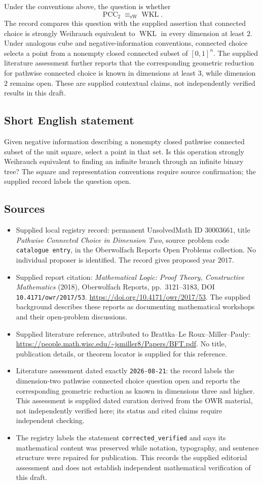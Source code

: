\documentclass[11pt]{article}
\begin{document}
Under the conventions above, the question is whether
\[
\operatorname{PCC}_2\equiv_{\mathrm{sW}}\operatorname{WKL}.
\]
The record compares this question with the supplied assertion that connected choice is strongly Weihrauch equivalent to \(\operatorname{WKL}\) in every dimension at least \(2\). Under analogous cube and negative-information conventions, connected choice selects a point from a nonempty closed connected subset of \([0,1]^n\). The supplied literature assessment further reports that the corresponding geometric reduction for pathwise connected choice is known in dimensions at least \(3\), while dimension \(2\) remains open. These are supplied contextual claims, not independently verified results in this draft.
\subsection{Short English statement}
Given negative information describing a nonempty closed pathwise connected subset of the unit square, select a point in that set. Is this operation strongly Weihrauch equivalent to finding an infinite branch through an infinite binary tree? The square and representation conventions require source confirmation; the supplied record labels the question open.
\subsection{Sources}
\begin{itemize}
\item Supplied local registry record: permanent UnsolvedMath ID \(30003661\), title \emph{Pathwise Connected Choice in Dimension Two}, source problem code \texttt{catalogue entry}, in the Oberwolfach Reports Open Problems collection. No individual proposer is identified. The record gives proposed year \(2017\).
\item Supplied report citation: \emph{Mathematical Logic: Proof Theory, Constructive Mathematics} (2018), Oberwolfach Reports, pp.\ 3121--3183, DOI \texttt{10.4171/owr/2017/53}. \url{https://doi.org/10.4171/owr/2017/53}. The supplied background describes these reports as documenting mathematical workshops and their open-problem discussions.
\item Supplied literature reference, attributed to Brattka--Le Roux--Miller--Pauly: \url{https://people.math.wisc.edu/~jsmiller8/Papers/BFT.pdf}. No title, publication details, or theorem locator is supplied for this reference.
\item Literature assessment dated exactly \texttt{2026-08-21}: the record labels the dimension-two pathwise connected choice question open and reports the corresponding geometric reduction as known in dimensions three and higher. This assessment is supplied dated curation derived from the OWR material, not independently verified here; its status and cited claims require independent checking.
\item The registry labels the statement \texttt{corrected\_verified} and says its mathematical content was preserved while notation, typography, and sentence structure were repaired for publication. This records the supplied editorial assessment and does not establish independent mathematical verification of this draft.
\end{itemize}
\end{document}
